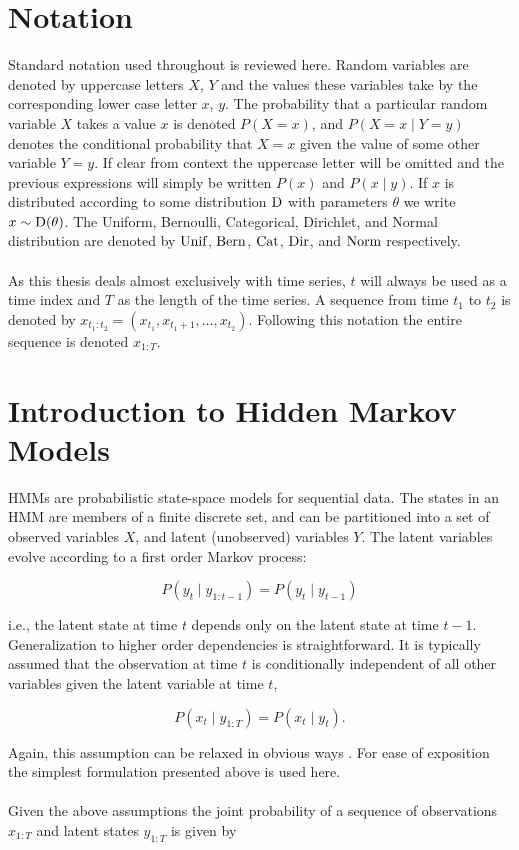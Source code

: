 \documentclass[12pt]{report}
\newcommand{\1}[0]{\mathbbm{1}}
\newcommand{\Unif}[0]{\textnormal{Unif}}
\newcommand{\Cat}[0]{\textnormal{Cat}}
\newcommand{\Dir}[0]{\textnormal{Dir}}
\newcommand{\Bern}[0]{\textnormal{Bern}}
\newcommand{\Norm}[0]{\textnormal{Norm}}
\newcommand{\SomeDist}[0]{\textnormal{D}}
\newcommand{\seq}[3]{\ensuremath{#1_{{#2}:{#3}}}}
\begin{document}
\section{Notation}
Standard notation used throughout is reviewed here.
Random variables are denoted by uppercase letters $X$, $Y$
and the values these variables take by the corresponding lower case
letter $x$, $y$. The probability that a particular random variable $X$
takes a value $x$ is denoted $P(X=x)$, and $P(X=x \mid Y=y)$ denotes
the conditional probability that $X=x$ given the value of some other variable $Y=y$.
If clear from context the uppercase letter will be omitted and the previous expressions
will simply be written $P(x)$ and $P(x \mid y)$. If $x$ is distributed according to some
distribution $\SomeDist$ with parameters $\theta$ we write $x \sim \SomeDist(\theta)$.
The Uniform, Bernoulli, Categorical, Dirichlet, and Normal distribution are denoted by
$\Unif$, $\Bern$, $\Cat$, $\Dir$, and $\Norm$ respectively.
\\\\
As this thesis deals almost exclusively with time series, $t$ will always
be used as a time index and $T$ as the length of the time series.
A sequence from time $t_1$ to $t_2$ is denoted by
$\seq{x}{t_1}{t_2} = (x_{t_1}, x_{t_1 + 1}, \ldots, x_{t_2})$.
Following this notation the entire sequence is denoted $\seq{x}{1}{T}$.

\section{Introduction to Hidden Markov Models}
\label{sec:Introduction to Hidden Markov Models}
\acp{HMM} are probabilistic state-space models for sequential data.
The states in an \ac{HMM} are members of a finite discrete set, and
can be partitioned into a set of observed variables $X$, and latent
(unobserved) variables $Y$. The latent variables evolve according to
a first order Markov process:

\[
    P(y_t \mid \seq{y}{1}{t-1}) = P(y_t \mid y_{t-1})
\]

i.e., the latent state at time $t$ depends only on the latent state
at time $t-1$. Generalization to higher order dependencies is straightforward.
It is typically assumed that the observation at time $t$ is conditionally
independent of all other variables given the latent variable at time $t$,

\[
    P(x_t \mid \seq{y}{1}{T}) = P(x_t \mid y_t).
\]

Again, this assumption can be relaxed in obvious ways \cite{autoregressive-shannon}.
For ease of exposition the simplest formulation presented above is used here.
\\\\
Given the above assumptions the joint probability of a sequence of observations
$\seq{x}{1}{T}$ and latent states $\seq{y}{1}{T}$ is given by
\end{document}
